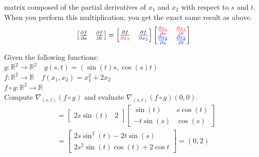 \documentclass{article}
\begin{document}
matrix composed of the partial derivatives of $x_1$ and $x_2$ with respect to
$s$ and $t$. When you perform this multiplication, you get the exact same
result as above.
$$
\begin{bmatrix}
    \frac{\partial{f}}{\partial{s}} & \frac{\partial{f}}{\partial{t}}
\end{bmatrix}=\begin{bmatrix}
    \frac{\partial{f}}{\color{red}\partial{x_1}} &
    \frac{\partial{f}}{\color{blue}\partial{x_2}}
\end{bmatrix}\begin{bmatrix}
    {\color{red}\frac{\partial{x_1}}{\partial{s}}} &
    {\color{red}\frac{\partial{x_1}}{\partial{t}}} \\ 
    {\color{blue}\frac{\partial{x_2}}{\partial{s}}} &
    {\color{blue}\frac{\partial{x_2}}{\partial{t}}}
\end{bmatrix}$$
\newpage
\begin{example}
    Given the following functions:\\
    $g:\mathbb{R}^2\to \mathbb{R}^2\quad g(s,t)=(\sin(t)s, \cos(s)t)$\\ 
    $f:\mathbb{R}^2\to \mathbb{R}\quad f(x_1,x_2)=x_1^2+2x_2$\\ 
    $f\circ g: \mathbb{R}^2\to \mathbb{R}$\\
    Compute $\nabla_{(s,t)}(f\circ g)$ and evaluate $\nabla_{(s,t)}(f\circ g)(0,0)$.
    $$
    \begin{aligned}
        &=\begin{bmatrix}
            2s\sin(t) & 2
        \end{bmatrix}
        \begin{bmatrix}
            \sin(t) & s\cos(t)\\ 
            -t\sin(s) & \cos(s)
        \end{bmatrix} \\ 
        &=\begin{bmatrix}
            2s\sin^2(t)-2t\sin(s) \\ 
            2s^2\sin(t)\cos(t)+2\cos{t}
        \end{bmatrix}=(0,2)
    \end{aligned}
    $$
\end{example}
\end{document}
